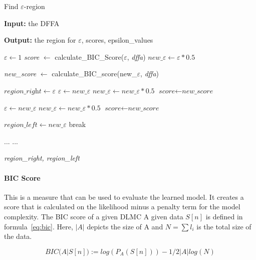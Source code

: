 \documentclass[
a4paper,
12pt
]{scrartcl}
\begin{document}
\begin{algorithm}[h]
\caption{Find $\varepsilon$-region}\label{alg:findregion}
\begin{algorithmic}[1]
\item \textbf{Input:} the DFFA
\item \textbf{Output:} the region for $\varepsilon$, scores, epsilon\_values

\State $\varepsilon \gets \textit{1}$
\State \textit{score} $\gets$ calculate\_BIC\_Score($\varepsilon$, \textit{dffa})
\State $new\_\varepsilon \gets \varepsilon * 0.5$


       \State \textit{new\_score} $\gets$ calculate\_BIC\_score(new\_$\varepsilon$, \textit{dffa})

           \label{findregion:scorelarger}
         \State $\textit{region\_right} \gets \varepsilon$
         \State $\varepsilon \gets new\_\varepsilon$
         \State $ new\_\varepsilon \gets new\_\varepsilon * 0.5$
         \State $\textit{score} \gets \textit{new\_score} $

           \label{findregion:scorethesame}
   	 \State $\varepsilon \gets new\_\varepsilon$
         \State $ new\_\varepsilon \gets new\_\varepsilon * 0.5$
         \State $\textit{score} \gets \textit{new\_score} $

      \Else \label{findregion:scoresmaller}
      \State $\textit{region\_left} \gets new\_\varepsilon$
        \State break
       \EndIf

  \EndWhile

  \State ...
  \State ...

\State \Return \textit{region\_right, region\_left}
\end{algorithmic}
\end{algorithm}

\paragraph{BIC Score} This is a measure that can be used to evaluate the learned model. It creates a score that is calculated on the likelihood minus a penalty term for the model complexity. The BIC score of a given DLMC A given data $S[n]$ is defined in formula~\ref{eq:bic}. Here, $|A|$ depicts the size of A and $N = \sum l_i$ is the total size of the data.

\begin{equation} \label{eq:bic}
  BIC(A | S[n]) := log(P_A(S[n])) - 1/2 | A | log(N)
\end{equation}
\end{document}
